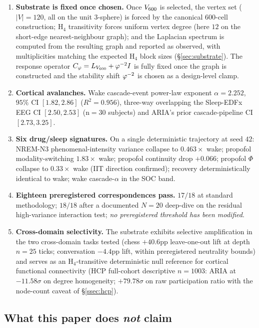 \begin{enumerate}\itemsep=2pt
\item \textbf{Substrate is fixed once chosen.} Once $V_{600}$
  is selected, the vertex set ($|V|=120$, all on the unit
  $3$-sphere) is forced by the canonical 600-cell construction; H$_4$
  transitivity forces uniform vertex degree (here $12$ on the
  short-edge nearest-neighbour graph); and the Laplacian spectrum is
  computed from the resulting graph and reported as observed, with
  multiplicities matching the expected H$_4$ block sizes
  (\S\ref{sec:substrate}). The response operator
  $C_{\varphi} = L_{V_{600}} + \varphi^{-2} I$ is fully fixed once the graph is
  constructed and the stability shift $\varphi^{-2}$ is chosen as a
  design-level clamp.
\item \textbf{Cortical avalanches.} Wake cascade-event power-law
  exponent $\alpha = 2.252$, $95\%$ CI $[1.82, 2.86]$ ($R^{2}=0.956$),
  three-way overlapping the Sleep-EDFx EEG CI $[2.50, 2.53]$
  (n$=$30 subjects) and ARIA's prior cascade-pipeline CI
  $[2.73, 3.25]$.
\item \textbf{Six drug/sleep signatures.} On a single deterministic
  trajectory at seed $42$: NREM-N3 phenomenal-intensity variance
  collapse to $0.463\!\times$ wake; propofol modality-switching
  $1.83\!\times$ wake; propofol continuity drop $+0.066$; propofol
  $\Phi$ collapse to $0.33\!\times$ wake (IIT direction confirmed);
  recovery deterministically identical to wake; wake cascade-$\alpha$
  in the SOC band.
\item \textbf{Eighteen preregistered correspondences pass.}
  $17/18$ at standard methodology; $18/18$ after a documented
  $N\!=\!20$ deep-dive on the residual high-variance interaction
  test; \emph{no preregistered threshold has been modified}.
\item \textbf{Cross-domain selectivity.} The substrate exhibits
  selective amplification in the two cross-domain tasks tested
  (chess $+40.6$pp leave-one-out lift at depth $n\!=\!25$ ticks;
  conversation $-4.4$pp lift, within preregistered neutrality bounds)
  and serves as an H$_4$-transitive deterministic null reference for
  cortical functional connectivity (HCP full-cohort descriptive
  $n\!=\!1003$: ARIA at $-11.58\sigma$ on degree homogeneity;
  $+79.78\sigma$ on raw participation ratio with the node-count caveat
  of \S\ref{ssec:hcp}).
\end{enumerate}

\subsection*{What this paper does \emph{not} claim}

